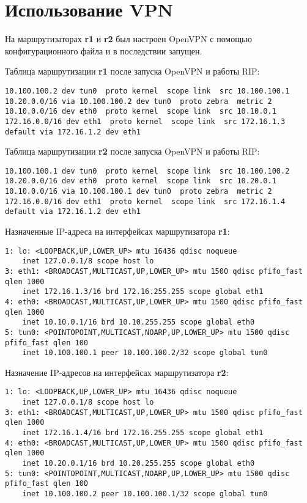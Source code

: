 \documentclass[a4paper,12pt]{article}
\begin{document}
\section{Использование VPN}

На маршрутизаторах \textbf{r1} и \textbf{r2} был настроен OpenVPN с помощью конфигурационного файла и в последствии запущен.

Таблица маршрутизации \textbf{r1} после запуска OpenVPN и работы RIP:
\begin{Verbatim}
10.100.100.2 dev tun0  proto kernel  scope link  src 10.100.100.1 
10.20.0.0/16 via 10.100.100.2 dev tun0  proto zebra  metric 2 
10.10.0.0/16 dev eth0  proto kernel  scope link  src 10.10.0.1 
172.16.0.0/16 dev eth1  proto kernel  scope link  src 172.16.1.3 
default via 172.16.1.2 dev eth1
\end{Verbatim}

Таблица маршрутизации \textbf{r2} после запуска OpenVPN и работы RIP:
\begin{Verbatim}
10.100.100.1 dev tun0  proto kernel  scope link  src 10.100.100.2 
10.20.0.0/16 dev eth0  proto kernel  scope link  src 10.20.0.1 
10.10.0.0/16 via 10.100.100.1 dev tun0  proto zebra  metric 2 
172.16.0.0/16 dev eth1  proto kernel  scope link  src 172.16.1.4 
default via 172.16.1.2 dev eth1
\end{Verbatim}

Назначенные IP-адреса на интерфейсах маршрутизатора \textbf{r1}:
\begin{Verbatim}
1: lo: <LOOPBACK,UP,LOWER_UP> mtu 16436 qdisc noqueue 
    inet 127.0.0.1/8 scope host lo
3: eth1: <BROADCAST,MULTICAST,UP,LOWER_UP> mtu 1500 qdisc pfifo_fast qlen 1000
    inet 172.16.1.3/16 brd 172.16.255.255 scope global eth1
4: eth0: <BROADCAST,MULTICAST,UP,LOWER_UP> mtu 1500 qdisc pfifo_fast qlen 1000
    inet 10.10.0.1/16 brd 10.10.255.255 scope global eth0
5: tun0: <POINTOPOINT,MULTICAST,NOARP,UP,LOWER_UP> mtu 1500 qdisc pfifo_fast qlen 100
    inet 10.100.100.1 peer 10.100.100.2/32 scope global tun0
\end{Verbatim}

Назначение IP-адресов на интерфейсах маршрутизатора \textbf{r2}:
\begin{Verbatim}
1: lo: <LOOPBACK,UP,LOWER_UP> mtu 16436 qdisc noqueue 
    inet 127.0.0.1/8 scope host lo
3: eth1: <BROADCAST,MULTICAST,UP,LOWER_UP> mtu 1500 qdisc pfifo_fast qlen 1000
    inet 172.16.1.4/16 brd 172.16.255.255 scope global eth1
4: eth0: <BROADCAST,MULTICAST,UP,LOWER_UP> mtu 1500 qdisc pfifo_fast qlen 1000
    inet 10.20.0.1/16 brd 10.20.255.255 scope global eth0
5: tun0: <POINTOPOINT,MULTICAST,NOARP,UP,LOWER_UP> mtu 1500 qdisc pfifo_fast qlen 100
    inet 10.100.100.2 peer 10.100.100.1/32 scope global tun0
\end{Verbatim}
\end{document}
